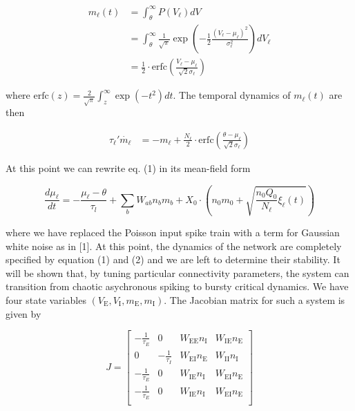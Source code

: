 \documentclass{article} %
\begin{document}
\begin{align*}
m_{\ell}(t) &= \int_{\theta}^{\infty} P(V_{\ell})dV\\
&= \int_{\theta}^{\infty} \frac{1}{\sqrt{\pi}}\exp\left(-\frac{1}{2}\frac{\left(V_{\ell}-\mu_{\ell}\right)^{2}}{\sigma_{\ell}^{2}}\right)dV_{\ell}\\
&= \frac{1}{2}\cdot \mathrm{erfc}\left(\frac{V_{\ell}-\mu_{\ell}}{\sqrt{2}\sigma_{\ell}}\right)
\end{align*}


where $\mathrm{erfc}(z) = \frac{2}{\sqrt{\pi}}\int_{z}^{\infty} \exp\left(-t^{2}\right)dt$. The temporal dynamics of $m_{\ell}(t)$ are then

\begin{align}
\tau_{\ell}'\dot{m_{\ell}} &= -m_{\ell} + \frac{N_{\ell}}{2}\cdot \mathrm{erfc}\left(\frac{\theta-\mu_{\ell}}{\sqrt{2}\sigma_{\ell}}\right)
\end{align}

At this point we can rewrite eq. (1) in its mean-field form

\begin{equation}
\frac{d\mu_{\ell}}{dt} = -\frac{\mu_{\ell}-\theta}{\tau_{l}} + \sum_{b} W_{ab}n_{b}m_{b} + X_{0}\cdot\left(n_{0}m_{0} + \sqrt{\frac{n_{0}Q_{0}}{N_{\ell}}\xi_{\ell}(t)}\right)
\end{equation}

where we have replaced the Poisson input spike train with a term for Gaussian white noise as in [1]. At this point, the dynamics of the network are completely specified by equation (1) and (2) and we are left to determine their stability. It will be shown that, by tuning particular connectivity parameters, the system can transition from chaotic asychronous spiking to bursty critical dynamics. We have four state variables $\left(V_{\mathrm{E}}, V_{\mathrm{I}}, m_{\mathrm{E}}, m_{\mathrm{I}}\right)$. The Jacobian matrix for such a system is given by 

\begin{equation*}
J = \begin{bmatrix}
-\frac{1}{\tau_{E}} & 0 & W_{\mathrm{EE}}n_{\mathrm{I}} & W_{\mathrm{IE}}n_{\mathrm{E}} \\
0 &  -\frac{1}{\tau_{I}} & W_{\mathrm{EI}}n_{\mathrm{E}} & W_{\mathrm{II}}n_{\mathrm{I}} \\
-\frac{1}{\tau_{E}} & 0 & W_{\mathrm{IE}}n_{\mathrm{I}} & W_{\mathrm{EI}}n_{\mathrm{E}} \\
-\frac{1}{\tau_{E}} & 0 & W_{\mathrm{IE}}n_{\mathrm{I}} & W_{\mathrm{EI}}n_{\mathrm{E}} \\
\end{bmatrix}
\end{equation*}
\end{document}
